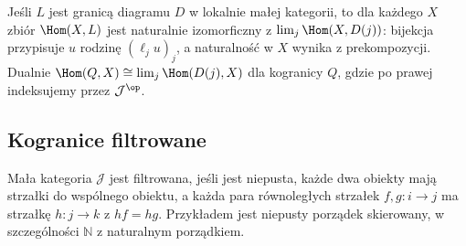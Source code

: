 \begin{przyklad}
Jeśli $L$ jest granicą diagramu $D$ w lokalnie małej kategorii, to dla każdego $X$ zbiór $\Hom(X,L)$ jest naturalnie izomorficzny z $\lim_j\Hom(X,D(j))$: bijekcja przypisuje $u$ rodzinę $(\ell_ju)_j$, a naturalność w $X$ wynika z prekompozycji. Dualnie $\Hom(Q,X)\cong\lim_j\Hom(D(j),X)$ dla kogranicy $Q$, gdzie po prawej indeksujemy przez $\mathcal J^{\op}$.
\end{przyklad}

\subsection{Kogranice filtrowane}

\begin{definicja}\label{cat:def:filtered}
Mała kategoria $\mathcal J$ jest filtrowana, jeśli jest niepusta, każde dwa obiekty mają strzałki do wspólnego obiektu, a każda para równoległych strzałek $f,g:i\to j$ ma strzałkę $h:j\to k$ z $hf=hg$. Przykładem jest niepusty porządek skierowany, w szczególności $\mathbb N$ z naturalnym porządkiem.
\end{definicja}

